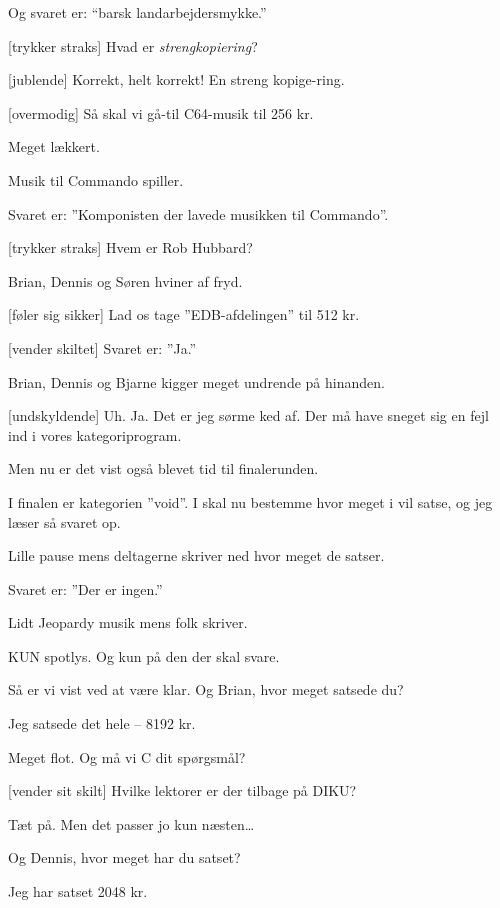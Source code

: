 \documentclass[danish]{article}
\begin{document}
\begin{sketch}
 Og svaret er: ``barsk landarbejdersmykke.''

[trykker straks] Hvad er \emph{strengkopiering}?

[jublende] Korrekt, helt korrekt! En streng kopige-ring.

[overmodig] Så skal vi gå-til C64-musik til 256 kr.

 Meget lækkert. 

\scene Musik til Commando spiller.

 Svaret er: ''Komponisten der lavede musikken til Commando''.

[trykker straks] Hvem er Rob Hubbard?

\scene Brian, Dennis og Søren hviner af fryd.

[føler sig sikker] Lad os tage ''EDB-afdelingen'' til 512 kr.

[vender skiltet] Svaret er: ''Ja.''

\scene Brian, Dennis og Bjarne kigger meget undrende på hinanden.

[undskyldende] Uh. Ja. Det er jeg sørme ked af. Der må have 
sneget sig en fejl ind i vores kategoriprogram.

Men nu er det vist også blevet tid til finalerunden.

I finalen er kategorien ''void''. I skal nu bestemme hvor meget i vil satse, og
jeg læser så svaret op.

\scene Lille pause mens deltagerne skriver ned hvor meget de satser.

 Svaret er: ''Der er ingen.''

\scene Lidt Jeopardy musik mens folk skriver.

\scene KUN spotlys. Og kun på den der skal svare. 

 Så er vi vist ved at være klar. Og Brian, hvor meget satsede du?

 Jeg satsede det hele -- 8192 kr.

 Meget flot. Og må vi C dit spørgsmål?

[vender sit skilt] Hvilke lektorer er der tilbage på DIKU?

 Tæt på. Men det passer jo kun næsten\ldots

Og Dennis, hvor meget har du satset?

 Jeg har satset 2048 kr.


\end{sketch}
\end{document}
